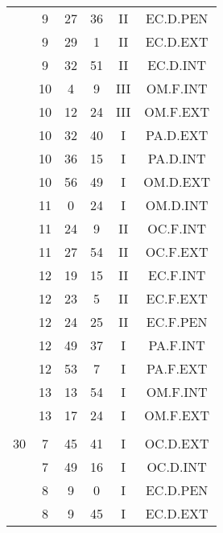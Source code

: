 \documentclass[12pt, a4paper]{article}
\begin{document}
\begin{multicols}{3}
{\begin{tabular}{c c c c c c}
	 	 	 	 & 9 & 27 & 36 & II & EC.D.PEN\\%
	 	 	 	 & 9 & 29 & 1 & II & EC.D.EXT\\%
	 	 	 	 & 9 & 32 & 51 & II & EC.D.INT\\%
	 	 	 	 & 10 & 4 & 9 & III & OM.F.INT\\%
	 	 	 	 & 10 & 12 & 24 & III & OM.F.EXT\\%
	 	 	 	 & 10 & 32 & 40 & I & PA.D.EXT\\%
	 	 	 	 & 10 & 36 & 15 & I & PA.D.INT\\%
	 	 	 	 & 10 & 56 & 49 & I & OM.D.EXT\\%
	 	 	 	 & 11 & 0 & 24 & I & OM.D.INT\\%
	 	 	 	 & 11 & 24 & 9 & II & OC.F.INT\\%
	 	 	 	 & 11 & 27 & 54 & II & OC.F.EXT\\%
	 	 	 	 & 12 & 19 & 15 & II & EC.F.INT\\%
	 	 	 	 & 12 & 23 & 5 & II & EC.F.EXT\\%
	 	 	 	 & 12 & 24 & 25 & II & EC.F.PEN\\%
	 	 	 	 & 12 & 49 & 37 & I & PA.F.INT\\%
	 	 	 	 & 12 & 53 & 7 & I & PA.F.EXT\\%
	 	 	 	 & 13 & 13 & 54 & I & OM.F.INT\\%
	 	 	 	 & 13 & 17 & 24 & I & OM.F.EXT\\%
	 	 	 	 & & & & & \\%
	 	 	 	30 & 7 & 45 & 41 & I & OC.D.EXT\\%
	 	 	 	 & 7 & 49 & 16 & I & OC.D.INT\\%
	 	 	 	 & 8 & 9 & 0 & I & EC.D.PEN\\%
	 	 	 	 & 8 & 9 & 45 & I & EC.D.EXT\\%

\end{tabular}}
\end{multicols}
\end{document}

